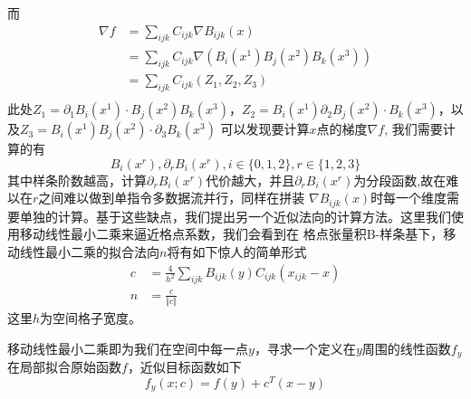 而
\begin{equation}
    \begin{split}
        \nabla f &= \sum_{ijk} C_{ijk} \nabla B_{ijk}(x)\\
        &= \sum_{ijk} C_{ijk} \nabla (B_i(x^1)B_j(x^2)B_k(x^3))\\
        &= \sum_{ijk} C_{ijk} (Z_1, Z_2, Z_3)\\
    \end{split}
\end{equation}
此处$Z_1 = \partial_1 B_i(x^1) \cdot B_j(x^2)B_k(x^3)$，$Z_2 = B_i(x^1) \partial_2 B_j(x^2)\cdot B_k(x^3)$，以及$Z_3 = B_i(x^1)B_j(x^2) \cdot\partial_3 B_k(x^3)$
可以发现要计算$x$点的梯度$\nabla f$, 我们需要计算的有$$B_i(x^r),\partial_r B_i(x^r), i \in \{0,1,2\}, r \in \{1,2,3\}$$其中样条阶数越高，计算$\partial_r B_i(x^r)$代价越大，并且$\partial_r B_i(x^r)$为分段函数,故在难以在$r$之间难以做到单指令多数据流并行，同样在拼装
$\nabla B_{ijk}(x)$时每一个维度需要单独的计算。基于这些缺点，我们提出另一个近似法向的计算方法。这里我们使用移动线性最小二乘来逼近格点系数，我们会看到在
格点张量积B-样条基下，移动线性最小二乘的拟合法向$n$将有如下惊人的简单形式
\begin{equation}
    \begin{split}
        c &= \frac{4}{h^2}\sum_{ijk}B_{ijk}(y)C_{ijk}(x_{ijk} - x)\nonumber\\
        n &= \frac{c}{\Vert c \Vert}          
    \end{split}
\end{equation}
这里$h$为空间格子宽度。

移动线性最小二乘即为我们在空间中每一点$y$，寻求一个定义在$y$周围的线性函数$f_y$在局部拟合原始函数$f$，近似目标函数如下
\begin{equation}
    f_y (x;c) = f(y) + c^T(x - y)    
\end{equation}

